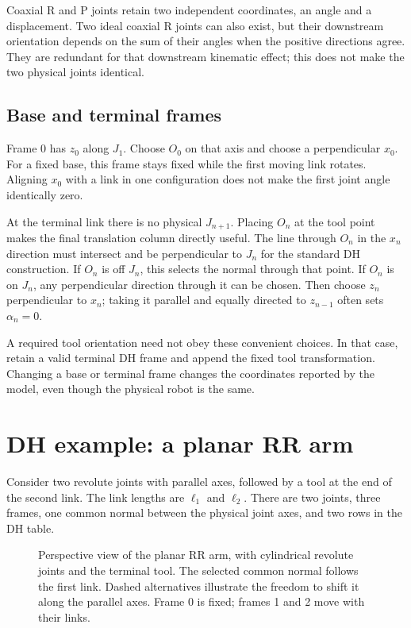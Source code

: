 Coaxial R and P joints retain two independent coordinates, an angle and a
displacement. Two ideal coaxial R joints can also exist, but their
downstream orientation depends on the sum of their angles when the
positive directions agree. They are redundant for that downstream
kinematic effect; this does not make the two physical joints identical.

\subsection{Base and terminal frames}
Frame 0 has $z_0$ along $J_1$. Choose $O_0$ on that axis and choose a
perpendicular $x_0$. For a fixed base, this frame stays fixed while the
first moving link rotates. Aligning $x_0$ with a link in one configuration
does not make the first joint angle identically zero.

At the terminal link there is no physical $J_{n+1}$. Placing $O_n$ at
the tool point makes the final translation column directly useful.
The line through $O_n$ in the $x_n$ direction must intersect and be
perpendicular to $J_n$ for the standard DH construction. If $O_n$ is off
$J_n$, this selects the normal through that point. If $O_n$ is on $J_n$,
any perpendicular direction through it can be chosen. Then choose $z_n$
perpendicular to $x_n$; taking it parallel and equally directed to
$z_{n-1}$ often sets $\alpha_n=0$.

A required tool orientation need not obey these convenient choices.
In that case, retain a valid terminal DH frame and append the fixed tool
transformation. Changing a base or terminal frame changes the coordinates
reported by the model, even though the physical robot is the same.

\section{DH example: a planar RR arm}
\label{sec:l10-dh-rr}
Consider two revolute joints with parallel axes, followed by a tool at
the end of the second link. The link lengths are $\ell_1$ and $\ell_2$.
There are two joints, three frames, one common normal between the physical
joint axes, and two rows in the DH table.

\begin{figure}[htbp]
\centering
\caption{Perspective view of the planar RR arm, with cylindrical revolute
joints and the terminal tool. The selected common normal follows the
first link. Dashed alternatives illustrate the freedom to shift it along
the parallel axes. Frame 0 is fixed; frames 1 and 2 move with their links.}
\label{fig:l10-dh-rr}
\end{figure}

